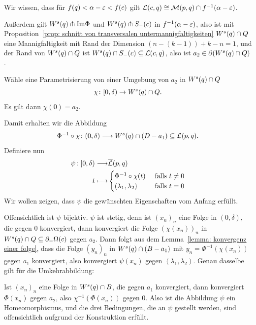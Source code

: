 \begin{bigproof}
    Wir wissen, dass für $f(q) < \alpha - \varepsilon < f(c)$ gilt 
    ${ \mathcal{L} } (c, q) \cong \mathcal{M} (p, q) \cap f^{-1}(\alpha - \varepsilon)$. 
    
    Außerdem gilt ${ W^s } (q) \pitchfork { \operatorname{Im} } \Phi$ und ${ W^s } (q) \pitchfork S_-(c)$ in 
    $f^{-1}(\alpha - \varepsilon)$, also ist mit 
    Proposition~\ref{prop: schnitt von transversalen untermannigfaltigkeiten}
    ${ W^s } (q) \cap Q$ eine Mannigfaltigkeit mit Rand der Dimension $(n - (k - 1)) + k - n = 1$,
    und der Rand von ${ W^s } (q) \cap Q$ ist ${ W^s } (q) \cap S_-(c) \subseteq { \mathcal{L} } (c, q)$, also ist 
    $a_2 \in { \partial } ({ W^s }(q) \cap Q)$.

    Wähle eine Parametrisierung von einer Umgebung von $a_2$ in ${ W^s } (q) \cap Q$
    \[ \chi \colon [0, \delta) \to { W^s } (q) \cap Q . \]
    Es gilt dann $\chi(0) = a_2$.
    
    Damit erhalten wir die Abbildung 
    \[ \Phi^{-1} \circ \chi \colon (0, \delta) \longrightarrow { W^s } (q) \cap (D - a_1) \subseteq { \mathcal{L} } (p, q) . \]
    Definiere nun 
    \begin{align*} 
        \psi \colon [0, \delta) \longrightarrow & {\overline{\mathcal{L}} } (p, q) \\
        t \longmapsto & \begin{cases}
            \Phi^{-1} \circ \chi (t) & \text{ falls } t \neq 0 \\
            (\lambda_1, \lambda_2) & \text{ falls } t = 0
        \end{cases}
    \end{align*}
    Wir wollen zeigen, dass $\psi$ die gewünschten Eigenschaften vom Anfang erfüllt.

    Offensichtlich ist $\psi$ bijektiv. $\psi$ ist stetig, denn ist $(x_n)_n$ eine Folge in 
    $(0, \delta)$, die gegen $0$ konvergiert, dann konvergiert die Folge $(\chi(x_n))_n$ in 
    ${ W^s } (q) \cap Q \subseteq { \partial }_- \Omega (c)$ gegen $a_2$. Dann folgt aus dem 
    Lemma~\ref{lemma: konvergenz einer folge}, dass die  Folge $(y_n)_n$ in ${ W^s } (q) \cap (B - a_1)$
    mit $y_n = \Phi^{-1}(\chi(x_n))$ gegen $a_1$ konvergiert, also konvergiert $\psi(x_n)$ gegen
    $(\lambda_1, \lambda_2)$. Genau dasselbe gilt für die Umkehrabbildung:

    Ist $(x_n)_n$ eine Folge in ${ W^s } (q) \cap B$, die gegen $a_1$ konvergiert, dann konvergiert
    $\Phi (x_n)$ gegen $a_2$, also $\chi^{-1} (\Phi(x_n))$ gegen $0$.
    Also ist die Abbildung $\psi$ ein Homeomorphismus, und die drei Bedingungen, die an $\psi$ gestellt
    werden, sind offensichtlich aufgrund der Konstruktion erfüllt. 


\end{bigproof}
